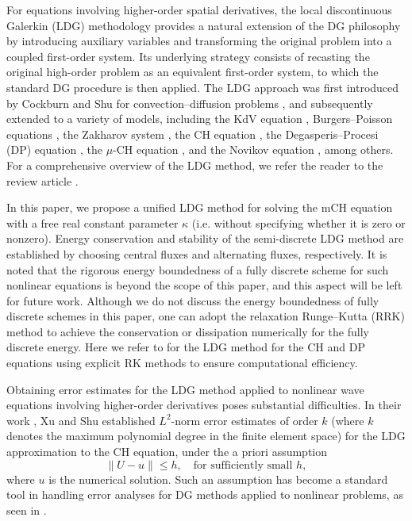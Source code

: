\documentclass[11pt]{article}
\numberwithin{equation}{section}
\begin{document}
For equations involving higher-order spatial derivatives, the local discontinuous Galerkin
(LDG) methodology provides a natural extension of the DG philosophy by introducing auxiliary variables and transforming the original problem into a coupled first-order system. Its underlying strategy consists of recasting the original high-order problem as an equivalent first-order system, to which the standard DG procedure is then applied. The LDG approach was first introduced by Cockburn and Shu for convection–diffusion problems \cite{Cockburn1998local}, and subsequently extended to a variety of models, including the KdV equation \cite{Yan2002}, Burgers–Poisson equations \cite{liu2015}, the Zakharov system \cite{Wang2024,xia2010JCP}, the CH equation \cite{Xu2008CH}, the Degasperis–Procesi (DP) equation \cite{Xu2011DP}, the $\mu$-CH equation \cite{Lu2023JCAM}, and the Novikov equation \cite{Tao2025MC}, among others. For a comprehensive overview of the LDG method, we refer the reader to the review article \cite{Xureview}.

In this paper, we propose a unified LDG method for solving the mCH equation with a free real constant parameter $\kappa$ (i.e. without specifying whether it is zero or nonzero). Energy conservation and stability of the semi-discrete LDG method are established by choosing central fluxes and alternating fluxes, respectively. It is noted that the rigorous energy boundedness
of a fully discrete scheme for such nonlinear equations is beyond the scope of this
paper, and this aspect will be left for future work. Although we do not discuss the energy boundedness of fully discrete schemes in this paper, one can adopt the relaxation Runge--Kutta (RRK) method \cite{Ketchson2019SINUM} to achieve the conservation or dissipation numerically for the fully discrete energy. Here we refer to \cite{Xu2008CH, Xu2011DP, ZhangCH} for the LDG method for the CH and DP equations using explicit RK methods to ensure computational efficiency. 

Obtaining error estimates for the LDG method applied to nonlinear wave equations involving higher-order derivatives poses substantial difficulties. In their work \cite{Xu2008CH}, Xu and Shu established $L^2$-norm error estimates of order $k$ (where $k$ denotes the maximum polynomial degree in the finite element space) for the LDG approximation to the CH equation, under the a priori assumption
\[
\|U-u\|\leq h,\quad \text{for sufficiently small }h,
\]
where $u$ is the numerical solution. Such an assumption has become a standard tool in handling error analyses for DG methods applied to nonlinear problems, as seen in \cite{Xu2011DP, ZhangCH}.
\end{document}
